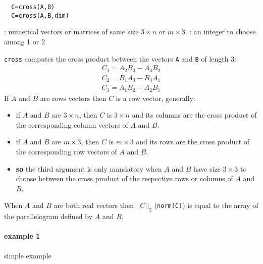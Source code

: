 \begin{mandesc}
\end{mandesc}
\begin{calling_sequence}
\begin{verbatim}
  C=cross(A,B)  
  C=cross(A,B,dim)  
\end{verbatim}
\end{calling_sequence}
\begin{parameters}
  \begin{varlist}
     : numerical vectors or matrices of same size $3 \times n$ or $m \times 3$. 
     : an integer to choose among 1 or 2
  \end{varlist}
\end{parameters}
\begin{mandescription}
  \verb+cross+ computes the cross product between the vectors \verb+A+ and \verb+B+ of length 3:
$$
\begin{array}{l}
     C_1 = A_2 B_3 - A_3 B_2 \\
     C_2 = B_1 A_3 - B_3 A_1 \\
     C_3 = A_1 B_2 - A_2 B_1
\end{array}
$$
 If  $A$ and $B$ are rows vectors then $C$ is a row vector, generally:
 \begin{itemize}
 \item if $A$ and $B$ are $3 \times n$, then $C$ is $3 \times n$ and its columns are the 
 cross product  of the corresponding column vectors of  $A$ and $B$.
 \item if $A$ and $B$ are $m \times 3$, then $C$ is $m \times 3$ and its rows are the 
 cross product  of the corresponding row vectors of  $A$ and $B$.
 \item {\bf so} the third argument is only mandatory when  $A$ and $B$ have size $3 \times 3$
 to choose between the cross product of the respective rows or columns of $A$ and $B$.
\end{itemize}
When $A$ and $B$ are both real vectors then $|| C ||_2$ (\verb+norm(C)+) is equal to the 
array of the parallelogram defined by $A$ and $B$.   
\end{mandescription}

\begin{examples}
\paragraph{example 1} simple example
  \begin{program}
  \end{program}
\end{examples}

\begin{manseealso}
\end{manseealso}

